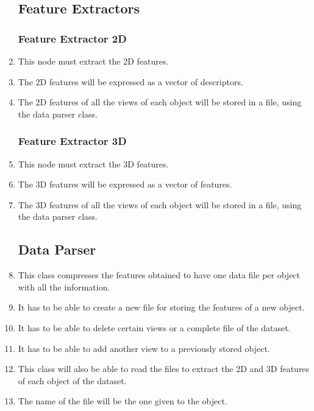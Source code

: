 \documentclass{article}
\makeatletter
\def\threedigits#1{\expandafter\@threedigits\csname c@#1\endcsname}
\def\@threedigits#1{%
  \ifnum#1<100 0\fi
  \ifnum#1<10 0\fi
  \number#1}
\makeatother
\begin{document}
\begin{center}
\begin{enumerate}[label=\textbf{FR\threedigits*}, leftmargin=2cm]
\subsection{Feature Extractors}
   \subsubsection{Feature Extractor 2D}
	\item This node must extract the 2D features. 
	\item The 2D features will be expressed as a vector of descriptors. %
	\item The 2D features of all the views of each object will be stored in a file, using the data parser class.  
  
  \subsubsection{Feature Extractor 3D}
   	\item This node must extract the 3D features. 
	\item The 3D features will be expressed as a vector of features. %
	\item The 3D features of all the views of each object will be stored in a file, using the data parser class.  

\subsection{Data Parser}
\item This class compresses the features obtained to have one data file per object with all the information.
 
\item It has to be able to create a new file for storing the features of a new object. 
\item It has to be able to delete certain views or a complete file of the dataset. 
\item It has to be able to add another view to a previously stored object. 

\item This class will also be able to read the files to extract the 2D and 3D features of each object of the dataset. 

\item The name of the file will be the one given to the object. 

			

\end{enumerate}
\end{center}
\end{document}
